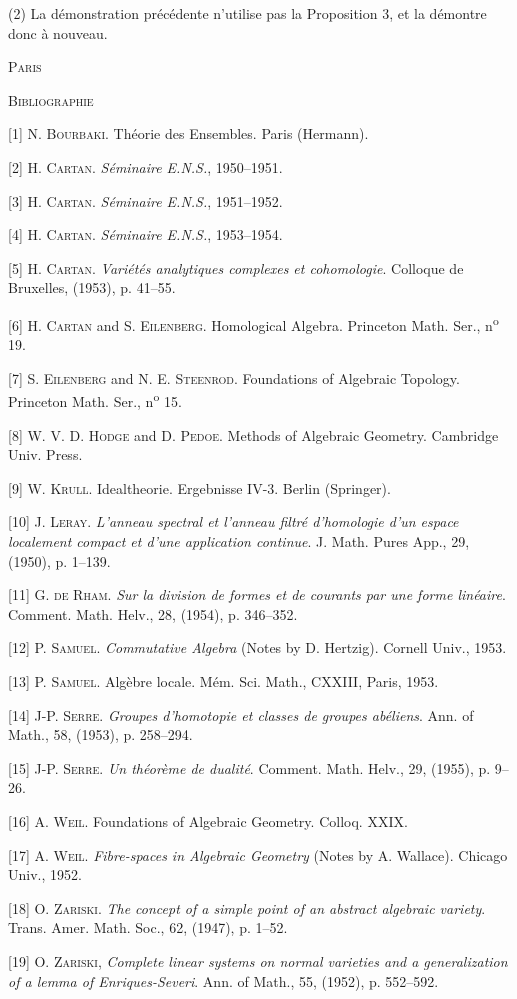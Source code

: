 (2) La démonstration précédente n'utilise pas la Proposition 3, et la démontre donc à nouveau.


\textsc{Paris}


\textsc{Bibliographie}

[1] N. \textsc{Bourbaki}. Théorie des Ensembles. Paris (Hermann).

[2] H. \textsc{Cartan}. \textit{Séminaire E.N.S.}, 1950--1951.

[3] H. \textsc{Cartan}. \textit{Séminaire E.N.S.}, 1951--1952.

[4] H. \textsc{Cartan}. \textit{Séminaire E.N.S.}, 1953--1954.

[5] H. \textsc{Cartan}. \textit{Variétés analytiques complexes et cohomologie}. Colloque de Bruxelles, (1953), p. 41--55.



[6] H. \textsc{Cartan} and S. \textsc{Eilenberg}. Homological Algebra. Princeton Math. Ser., n\textsuperscript{o} 19.

[7] S. \textsc{Eilenberg} and N. E. \textsc{Steenrod}. Foundations of Algebraic Topology. Princeton Math. Ser., n\textsuperscript{o} 15.

[8] W. V. D. \textsc{Hodge} and D. \textsc{Pedoe}. Methods of Algebraic Geometry. Cambridge Univ. Press.

[9] W. \textsc{Krull}. Idealtheorie. Ergebnisse IV-3. Berlin (Springer).

[10] J. \textsc{Leray}. \textit{L'anneau spectral et l'anneau filtré d'homologie d'un espace localement compact et d'une application continue}. J. Math. Pures App., 29, (1950), p. 1--139.

[11] G. \textsc{de Rham}. \textit{Sur la division de formes et de courants par une forme linéaire}. Comment. Math. Helv., 28, (1954), p. 346--352.

[12] P. \textsc{Samuel}. \textit{Commutative Algebra} (Notes by D. Hertzig). Cornell Univ., 1953.

[13] P. \textsc{Samuel}. Algèbre locale. Mém. Sci. Math., CXXIII, Paris, 1953.

[14] J-P. \textsc{Serre}. \textit{Groupes d'homotopie et classes de groupes abéliens}. Ann. of Math., 58, (1953), p. 258--294.

[15] J-P. \textsc{Serre}. \textit{Un théorème de dualité}. Comment. Math. Helv., 29, (1955), p. 9--26.

[16] A. \textsc{Weil}. Foundations of Algebraic Geometry. Colloq. XXIX.

[17] A. \textsc{Weil}. \textit{Fibre-spaces in Algebraic Geometry} (Notes by A. Wallace). Chicago Univ., 1952.

[18] O. \textsc{Zariski}. \textit{The concept of a simple point of an abstract algebraic variety}. Trans. Amer. Math. Soc., 62, (1947), p. 1--52.

[19] O. \textsc{Zariski}, \textit{Complete linear systems on normal varieties and a generalization of a lemma of Enriques-Severi}. Ann. of Math., 55, (1952), p. 552--592.
